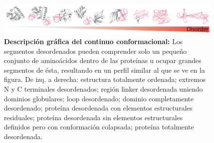 \begin{figure}[htbp]
\centering
\includegraphics[width=1.0\textwidth]{img/conformationContinuum.png} 
\caption{ \textbf{Descripción gráfica del continuo conformacional:} Los segmentos desordenados pueden comprender solo un pequeño conjunto de aminoácidos dentro de las proteínas u ocupar grandes segmentos de ésta, resultando en un
perfil similar al que se ve en la figura. De izq. a derecha: estructura totalmente ordenada; extremos N y C terminales desordenados; región linker desordenada uniendo dominios globulares; loop desordenado;
dominio completamente desordenado; proteína desordenada con elementos estructurales residuales; proteína desordenada sin elementos estructurales definidos pero con conformación colapsada; proteína totalmente desordenada.
}
\label{conformationContinuum}
\end{figure}






